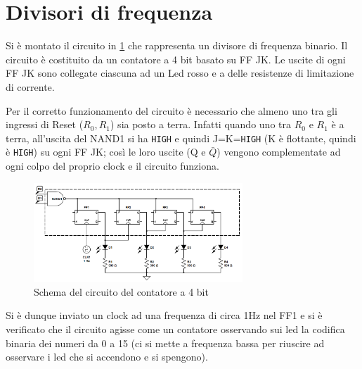 \documentclass[a4paper,10pt]{article}
\def\code#1{\texttt{#1}}
\begin{document}







\section{Divisori di frequenza}
Si è montato il circuito in \cref{fig:counter} che rappresenta un divisore di frequenza binario.
Il circuito è costituito da un contatore a 4 bit basato su FF JK. Le uscite di ogni FF JK sono collegate
ciascuna ad un Led rosso e a delle resistenze di limitazione di corrente.
\newline

Per il corretto funzionamento del circuito è necessario che almeno uno tra gli ingressi di Reset ($R_0 , R_1$)
sia posto a terra. Infatti quando uno tra $R_0$ e $R_1$ è a terra, all'uscita del NAND1 si ha \code{HIGH} e quindi J=K=\code{HIGH} (K è flottante, quindi è \code{HIGH}) su ogni FF JK; così le loro uscite (Q e $\bar{Q}$) vengono complementate ad ogni colpo del proprio clock e il circuito funziona.

\begin{figure}[H]
	\centering
	\includegraphics[width=0.7\textwidth]{../grafici/counterScheme.png}
	\caption{Schema del circuito del contatore a 4 bit}
	\label{fig:counter}
\end{figure}

Si è dunque inviato un clock ad una frequenza di circa 1Hz nel FF1 e si è verificato
che il circuito agisse come un contatore osservando sui led la codifica binaria dei numeri da 0 a 15 (ci si mette a frequenza bassa per riuscire ad osservare i led che si accendono e si spengono).
\end{document}
